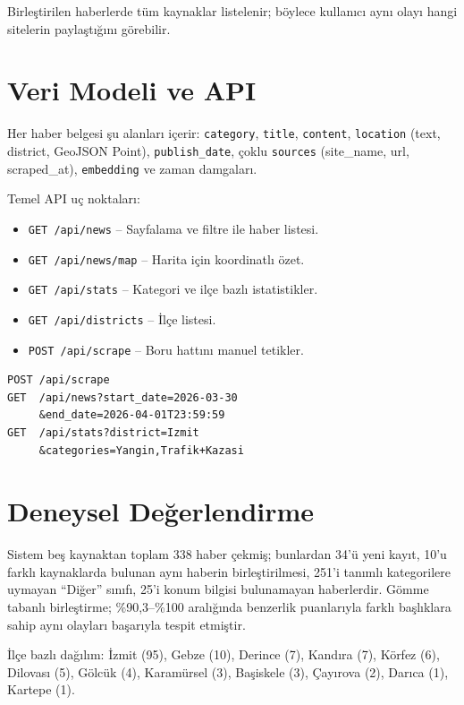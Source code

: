 \documentclass[conference,a4paper]{IEEEtran}
\begin{document}
Birleştirilen haberlerde tüm kaynaklar listelenir; böylece kullanıcı aynı olayı hangi sitelerin paylaştığını görebilir.

\section{Veri Modeli ve API}
Her haber belgesi şu alanları içerir: \texttt{category}, \texttt{title}, \texttt{content}, \texttt{location} (text, district, GeoJSON Point), \texttt{publish\_date}, çoklu \texttt{sources} (site\_name, url, scraped\_at), \texttt{embedding} ve zaman damgaları.

Temel API uç noktaları:
\begin{itemize}
    \item \texttt{GET /api/news} -- Sayfalama ve filtre ile haber listesi.
    \item \texttt{GET /api/news/map} -- Harita için koordinatlı özet.
    \item \texttt{GET /api/stats} -- Kategori ve ilçe bazlı istatistikler.
    \item \texttt{GET /api/districts} -- İlçe listesi.
    \item \texttt{POST /api/scrape} -- Boru hattını manuel tetikler.
\end{itemize}

\begin{lstlisting}
POST /api/scrape
GET  /api/news?start_date=2026-03-30
     &end_date=2026-04-01T23:59:59
GET  /api/stats?district=Izmit
     &categories=Yangin,Trafik+Kazasi
\end{lstlisting}

\section{Deneysel Değerlendirme}
Sistem beş kaynaktan toplam 338 haber çekmiş; bunlardan 34'ü yeni kayıt, 10'u farklı kaynaklarda bulunan aynı haberin birleştirilmesi, 251'i tanımlı kategorilere uymayan ``Diğer'' sınıfı, 25'i konum bilgisi bulunamayan haberlerdir. Gömme tabanlı birleştirme; \%90,3--\%100 aralığında benzerlik puanlarıyla farklı başlıklara sahip aynı olayları başarıyla tespit etmiştir.

İlçe bazlı dağılım: İzmit (95), Gebze (10), Derince (7), Kandıra (7), Körfez (6), Dilovası (5), Gölcük (4), Karamürsel (3), Başiskele (3), Çayırova (2), Darıca (1), Kartepe (1).
\end{document}
